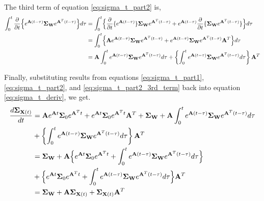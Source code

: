 \documentclass{article}
\begin{document}
The third term of equation \ref{eq:sigma_t_part2} is,
\begin{equation}
    \begin{aligned}
\int_0^t \frac{\partial}{\partial t} \Bigl \{ e^{\mathbf{A}(t-\tau)}  \mathbf{\Sigma}_\mathbf{W}  e^{\mathbf{A}^T(t-\tau)} \Bigr \} d\tau
&=\int_0^t \Bigl \{ \frac{\partial}{\partial t}  \{ e^{\mathbf{A}(t-\tau)}  \} \mathbf{\Sigma}_\mathbf{W} e^{\mathbf{A}^T(t-\tau)}  +  e^{\mathbf{A}(t-\tau)} \frac{\partial}{\partial t}  \{ \mathbf{\Sigma}_\mathbf{W} e^{\mathbf{A}^T(t-\tau)}  \} \Bigr \} d\tau \\
   &=\int_0^t \Bigl \{ \mathbf{A}  e^{\mathbf{A}(t-\tau)}  \mathbf{\Sigma}_\mathbf{W} e^{\mathbf{A}^T(t-\tau)}  +   e^{\mathbf{A}(t-\tau)} \mathbf{\Sigma}_\mathbf{W} e^{\mathbf{A}^T(t-\tau)} \mathbf{A}^T \Bigr \} d\tau \\
   &=\mathbf{A} \int_0^t  e^{\mathbf{A}(t-\tau)}  \mathbf{\Sigma}_\mathbf{W} e^{\mathbf{A}^T(t-\tau)} d\tau  + \left \{ \int_0^t  e^{\mathbf{A}(t-\tau)} \mathbf{\Sigma}_\mathbf{W} e^{\mathbf{A}^T(t-\tau)} d\tau \right \} \mathbf{A}^T \\
    \end{aligned}
    \label{eq:sigma_t_part2_3rd_term}
\end{equation}

Finally, substituting results from equations \ref{eq:sigma_t_part1}, \ref{eq:sigma_t_part2}, and \ref{eq:sigma_t_part2_3rd_term} back into equation \ref{eq:sigma_t_deriv}, we get.
\begin{equation}
\begin{aligned}
\frac{d \mathbf{\Sigma}_{\mathbf{X}(t)}}{dt}
&= \mathbf{A} e^{\mathbf{A}t} \mathbf{\Sigma}_0 e^{\mathbf{A}^Tt}+ e^{\mathbf{A}t} \mathbf{\Sigma}_0 e^{\mathbf{A}^Tt} \mathbf{A}^T +\mathbf{\Sigma}_\mathbf{W} + \mathbf{A} \int_0^t  e^{\mathbf{A}(t-\tau)}  \mathbf{\Sigma}_\mathbf{W} e^{\mathbf{A}^T(t-\tau)} d\tau \\
& + \left \{ \int_0^t  e^{\mathbf{A}(t-\tau)} \mathbf{\Sigma}_\mathbf{W} e^{\mathbf{A}^T(t-\tau)} d\tau \right \} \mathbf{A}^T \\
&=\mathbf{\Sigma}_\mathbf{W} +\mathbf{A} \Bigl \{ e^{\mathbf{A}t} \mathbf{\Sigma}_0 e^{\mathbf{A}^Tt} + \int_0^t  e^{\mathbf{A}(t-\tau)}  \mathbf{\Sigma}_\mathbf{W} e^{\mathbf{A}^T(t-\tau)} d\tau \Bigr \} \\
& + \Bigl \{ e^{\mathbf{A}t} \mathbf{\Sigma}_0 e^{\mathbf{A}^Tt} + \int_0^t  e^{\mathbf{A}(t-\tau)}  \mathbf{\Sigma}_\mathbf{W} e^{\mathbf{A}^T(t-\tau)} d\tau \Bigr \}  \mathbf{A}^T \\
&=\mathbf{\Sigma}_\mathbf{W} + \mathbf{A} \mathbf{\Sigma}_{\mathbf{X}(t)} + \mathbf{\Sigma}_{\mathbf{X}(t)} \mathbf{A}^T
\end{aligned}
\label{eq:sigma_t_deriv_final}
\end{equation}
\end{document}

